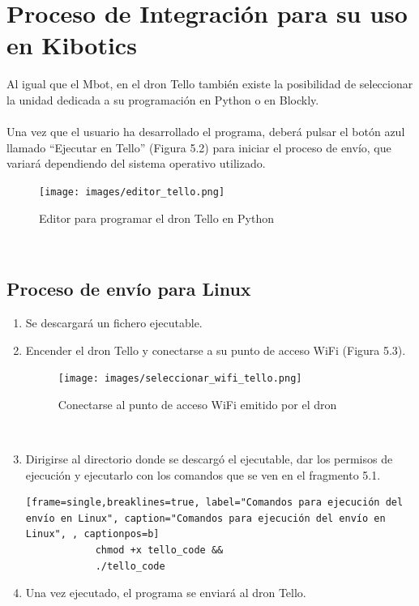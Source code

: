 \documentclass{report}
\begin{document}
\section{Proceso de Integración para su uso en Kibotics}

Al igual que el Mbot, en el dron Tello también existe la posibilidad de seleccionar la unidad dedicada a su programación en Python o en Blockly.
\\
\\
Una vez que el usuario ha desarrollado el programa, deberá pulsar el botón azul llamado “Ejecutar en Tello” (Figura 5.2) para iniciar el proceso de envío, que variará dependiendo del sistema operativo utilizado.
\\
\begin{figure}[h!]
  \centering
    \texttt{[image: images/editor\_tello.png]}
  \caption{Editor para programar el dron Tello en Python}
  \label{Editor para programar el dron Tello en Python}
\end{figure}
\\

\subsection{Proceso de envío para Linux}

\begin{enumerate}
	\item Se descargará un fichero ejecutable.
	\item Encender el dron Tello y conectarse a su punto de acceso WiFi (Figura 5.3).
	\\
		\begin{figure}[h!]
 			 \centering
    			\texttt{[image: images/seleccionar\_wifi\_tello.png]}
  			\caption{Conectarse al punto de acceso WiFi emitido por el dron}
  			\label{Conectarse al punto de acceso WiFi emitido por el dron}
		\end{figure}
	\\
	\item Dirigirse al directorio donde se descargó el ejecutable, dar los permisos de ejecución y ejecutarlo con los comandos que se ven en el fragmento 5.1.
	\\
		\begin{lstlisting}[frame=single,breaklines=true, label="Comandos para ejecución del envío en Linux", caption="Comandos para ejecución del envío en Linux", , captionpos=b]
			chmod +x tello_code &&
			./tello_code

		\end{lstlisting}
	\item Una vez ejecutado, el programa se enviará al dron Tello.

\end{enumerate}
	
\end{document}
